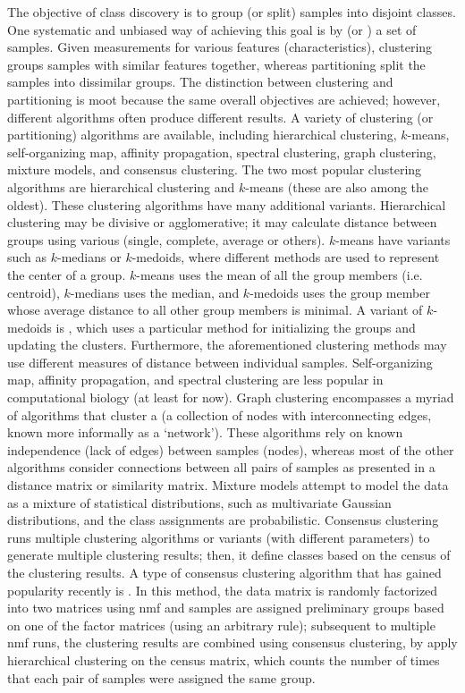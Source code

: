 The objective of class discovery is to group (or split) samples into disjoint classes. One systematic and unbiased way of achieving this goal is by  (or ) a set of samples. Given measurements for various features (characteristics), clustering groups samples with similar features together, whereas partitioning split the samples into dissimilar groups. The distinction between clustering and partitioning is moot because the same overall objectives are achieved; however, different algorithms often produce different results.  A variety of clustering (or partitioning) algorithms are available, including hierarchical clustering, $k$-means, self-organizing map, affinity propagation, spectral clustering, graph clustering, mixture models, and consensus clustering. The two most popular clustering algorithms are hierarchical clustering and $k$-means (these are also among the oldest). These clustering algorithms have many additional variants. Hierarchical clustering may be divisive or agglomerative; it may calculate distance between groups using various  (single, complete, average or others). $k$-means have variants such as $k$-medians or $k$-medoids, where different methods are used to represent the center of a group. $k$-means uses the mean of all the group members (i.e. centroid), $k$-medians uses the median, and $k$-medoids uses the group member whose average distance to all other group members is minimal. A variant of $k$-medoids is , which uses a particular method for initializing the groups and updating the clusters. Furthermore, the aforementioned clustering methods may use different measures of distance between individual samples. Self-organizing map, affinity propagation, and spectral clustering are less popular in computational biology (at least for now). Graph clustering encompasses a myriad of algorithms that cluster a  (a collection of nodes with interconnecting edges, known more informally as a `network'). These algorithms rely on known independence (lack of edges) between samples (nodes), whereas most of the other algorithms consider connections between all pairs of samples as presented in a distance matrix or similarity matrix. Mixture models attempt to model the data as a mixture of statistical distributions, such as multivariate Gaussian distributions, and the class assignments are probabilistic. Consensus clustering runs multiple clustering algorithms or variants (with different parameters) to generate multiple clustering results; then, it define classes based on the census of the clustering results. A type of consensus clustering algorithm that has gained popularity recently is . In this method, the data matrix is randomly factorized into two matrices using \gls{nmf} and samples are assigned preliminary groups based on one of the factor matrices (using an arbitrary rule); subsequent to multiple \gls{nmf} runs, the clustering results are combined using consensus clustering, by apply hierarchical clustering on the census matrix, which counts the number of times that each pair of samples were assigned the same group.

